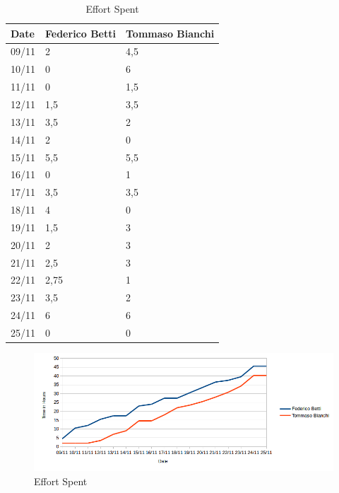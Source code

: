 \begin{table}[H]	
	\centering
	\def\arraystretch{1.25}
	\begin{tabular}{|m{5cm}|m{5cm}|m{5cm}|}
		\hline
		\textbf{Date} & \textbf{Federico Betti} & \textbf{Tommaso Bianchi} \\ \hline
		09/11 &	2 &		4,5 \\ \hline
		10/11 &	0 &		6 \\ \hline
		11/11 &	0 &		1,5 \\ \hline
		12/11 &	1,5 &	3,5 \\ \hline
		13/11 &	3,5 &	2 \\ \hline
		14/11 &	2 &		0 \\ \hline
		15/11 &	5,5 &	5,5 \\ \hline
		16/11 &	0 &		1 \\ \hline
		17/11 &	3,5 &	3,5 \\ \hline
		18/11 &	4 &		0 \\ \hline
		19/11 &	1,5 &	3 \\ \hline
		20/11 &	2 &		3 \\ \hline
		21/11 &	2,5 &	3 \\ \hline
		22/11 &	2,75 &	1 \\ \hline
		23/11 &	3,5 &	2 \\ \hline
		24/11 &	6 &		6 \\ \hline
		25/11 &	0 &		0 \\ \hline
	\end{tabular}
	\caption{Effort Spent}
\end{table}

\begin{figure}[H]
	\centering\includegraphics[width=\textwidth]{Images/EffortSpentGraph}
	\caption{Effort Spent}
\end{figure}